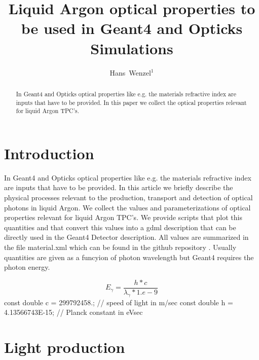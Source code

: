 \documentclass[a4paper]{jpconf}
\begin{document}
\title{Liquid Argon optical properties to be used in Geant4 and Opticks Simulations}

\author{ Hans~Wenzel$^1$}

\address{ $^1$~Fermilab PO Box 500, Batavia, IL 60510,
USA}


\begin{abstract}
  In Geant4 and Opticks optical properties like e.g. the materials refractive
  index are inputs that have to be provided. In this paper we collect the
  optical properties relevant for liquid Argon TPC's.   
\end{abstract}

\section{Introduction}
  In Geant4 and Opticks optical properties like e.g. the materials refractive
  index are inputs that have to be provided. In this article we briefly describe the physical processes relevant to the
  production, transport and detection of optical photons in liquid Argon. We collect the
  values and parameterizations of optical properties relevant for liquid Argon TPC's. We provide scripts that plot this quantities and that convert this values
  into a gdml description that can be directly used in the Geant4 Detector description.
  All values are summarized in the file material.xml which can be found in the github repository \cite{ref:scripts}.
  Usually quantities are given as a funcyion of photon wavelength but Geant4 requires the photon energy.
  
\begin{equation}
  E_{\gamma} = \frac{h * c}{\lambda_{\gamma} * 1.e-9}
  \label{equ:equation1}
\end{equation}
  const double c = 299792458.;         // speed of light in m/sec
  const double h = 4.13566743E-15;     // Planck constant in eVsec
  
  \section{Light production}  
\end{document}
